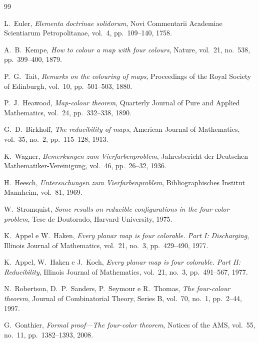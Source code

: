 \documentclass[11pt,a4paper]{article}
\theoremstyle{plain}
\theoremstyle{definition}
\begin{document}
\begin{thebibliography}{99}

L.~Euler,
\emph{Elementa doctrinae solidorum},
Novi Commentarii Academiae Scientiarum Petropolitanae, vol.~4, pp.~109--140, 1758.

A.~B.~Kempe,
\emph{How to colour a map with four colours},
Nature, vol.~21, no.~538, pp.~399--400, 1879.

P.~G.~Tait,
\emph{Remarks on the colouring of maps},
Proceedings of the Royal Society of Edinburgh, vol.~10, pp.~501--503, 1880.

P.~J.~Heawood,
\emph{Map-colour theorem},
Quarterly Journal of Pure and Applied Mathematics, vol.~24, pp.~332--338, 1890.

G.~D.~Birkhoff,
\emph{The reducibility of maps},
American Journal of Mathematics, vol.~35, no.~2, pp.~115--128, 1913.

K.~Wagner,
\emph{Bemerkungen zum Vierfarbenproblem},
Jahres\-bericht der Deutschen Mathe\-matiker-Vereinigung, vol.~46, pp.~26--32, 1936.

H.~Heesch,
\emph{Untersuchungen zum Vierfarbenproblem},
Bibliographisches Institut Mannheim, vol.~81, 1969.

W.~Stromquist,
\emph{Some results on reducible configurations in the four-color problem},
Tese de Doutorado, Harvard University, 1975.

K.~Appel e W.~Haken,
\emph{Every planar map is four colorable. Part I: Discharging},
Illinois Journal of Mathematics, vol.~21, no.~3, pp.~429--490, 1977.

K.~Appel, W.~Haken e J.~Koch,
\emph{Every planar map is four colorable. Part II: Reducibility},
Illinois Journal of Mathematics, vol.~21, no.~3, pp.~491--567, 1977.

N.~Robertson, D.~P.~Sanders, P.~Seymour e R.~Thomas,
\emph{The four-colour theorem},
Journal of Combinatorial Theory, Series B, vol.~70, no.~1, pp.~2--44, 1997.

G.~Gonthier,
\emph{Formal proof---The four-color theorem},
Notices of the AMS, vol.~55, no.~11, pp.~1382--1393, 2008.

\end{thebibliography}
\end{document}
